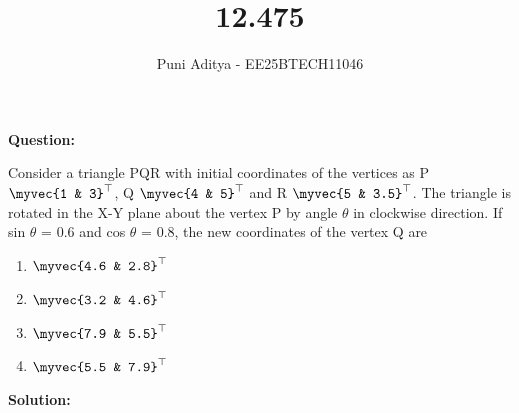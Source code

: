 \documentclass[journal]{IEEEtran}
\begin{document}
\title{12.475}
\author{Puni Aditya - EE25BTECH11046}
\maketitle

\textbf{Question:}

Consider a triangle PQR with initial coordinates of the vertices as P $\myvec{1 & 3}^\top$, Q $\myvec{4 & 5}^\top$ and R $\myvec{5 & 3.5}^\top$. The triangle is rotated in the X-Y plane about the vertex P by angle $\theta$ in clockwise direction. If sin $\theta$ = 0.6 and cos $\theta$ = 0.8, the new coordinates of the vertex Q are
\begin{enumerate}
    \item $\myvec{4.6 & 2.8}^\top$
    \item $\myvec{3.2 & 4.6}^\top$
    \item $\myvec{7.9 & 5.5}^\top$
    \item $\myvec{5.5 & 7.9}^\top$
\end{enumerate}

\textbf{Solution:}
\end{document}
